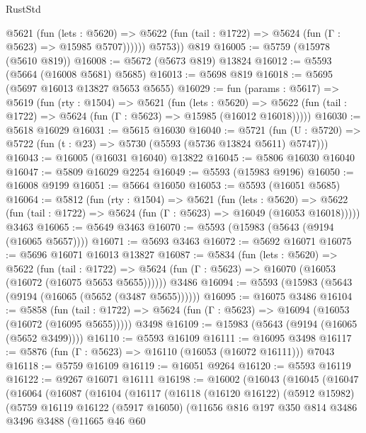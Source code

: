 \begin{lexlean}{RustStd}
\begin{coremodule}
            @5621
              (fun (lets : @5620) =>
              @5622 (fun (tail : @1722) => @5624 (fun (Γ : @5623) => @15985 @5707))))))
        @5753))
    @819
@16005 := @5759 (@15978 (@5610 @819))
@16008 := @5672 (@5673 @819) @13824
@16012 := @5593 (@5664 (@16008 @5681) @5685)
@16013 := @5698 @819
@16018 := @5695 (@5697 @16013 @13827 @5653 @5655)
@16029 := fun (params : @5617) =>
  @5619
    (fun (rty : @1504) =>
    @5621
      (fun (lets : @5620) =>
      @5622 (fun (tail : @1722) => @5624 (fun (Γ : @5623) => @15985 (@16012 @16018)))))
@16030 := @5618 @16029
@16031 := @5615 @16030
@16040 := @5721
    (fun (U : @5720) => @5722 (fun (t : @23) => @5730 (@5593 (@5736 @13824 @5611) @5747)))
@16043 := @16005 (@16031 @16040) @13822
@16045 := @5806 @16030 @16040
@16047 := @5809 @16029 @2254
@16049 := @5593 (@15983 @9196)
@16050 := @16008 @9199
@16051 := @5664 @16050
@16053 := @5593 (@16051 @5685)
@16064 := @5812
    (fun (rty : @1504) =>
    @5621
      (fun (lets : @5620) =>
      @5622 (fun (tail : @1722) => @5624 (fun (Γ : @5623) => @16049 (@16053 @16018)))))
    @3463
@16065 := @5649 @3463
@16070 := @5593 (@15983 (@5643 (@9194 (@16065 @5657))))
@16071 := @5693 @3463
@16072 := @5692 @16071
@16075 := @5696 @16071 @16013 @13827
@16087 := @5834
    (fun (lets : @5620) =>
    @5622
      (fun (tail : @1722) =>
      @5624 (fun (Γ : @5623) => @16070 (@16053 (@16072 (@16075 @5653 @5655))))))
    @3486
@16094 := @5593 (@15983 (@5643 (@9194 (@16065 (@5652 (@3487 @5655))))))
@16095 := @16075 @3486
@16104 := @5858
    (fun (tail : @1722) => @5624 (fun (Γ : @5623) => @16094 (@16053 (@16072 (@16095 @5655)))))
    @3498
@16109 := @15983 (@5643 (@9194 (@16065 (@5652 @3499))))
@16110 := @5593 @16109
@16111 := @16095 @3498
@16117 := @5876 (fun (Γ : @5623) => @16110 (@16053 (@16072 @16111))) @7043
@16118 := @5759 @16109
@16119 := @16051 @9264
@16120 := @5593 @16119
@16122 := @9267 @16071 @16111
@16198 := @16002
    (@16043
      (@16045
        (@16047
          (@16064
            (@16087
              (@16104
                (@16117
                  (@16118
                    (@16120 @16122)
                    (@5912 @15982)
                    (@5759
                      @16119
                      @16122
                      (@5917 @16050)
                      (@11656
                        @816
                        @197
                        @350
                        @814
                        @3486
                        @3496
                        @3488
                        (@11665
                          @46
                          @60

\end{coremodule}
\end{lexlean}
